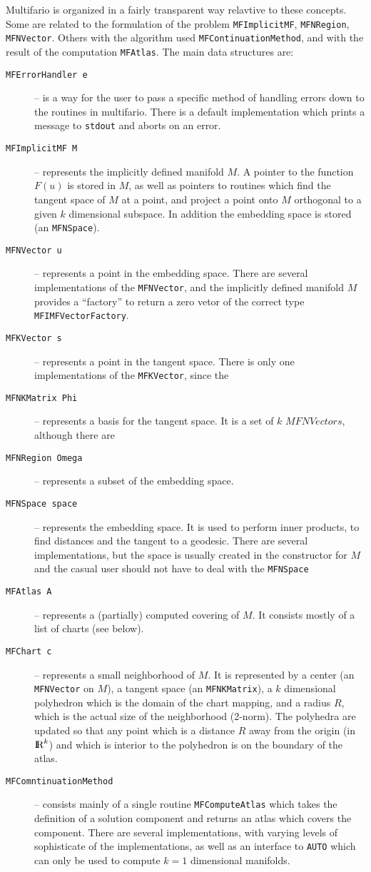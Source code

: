 \documentclass[12pt]{article}
\def\R{\hbox{\rm I\kern-.2150em R}}
\begin{document}
Multifario is organized in a fairly transparent way relavtive to these concepts. Some are related to the formulation of 
the problem {\tt MFImplicitMF}, {\tt MFNRegion}, {\tt MFNVector}. Others with the algorithm used {\tt MFContinuationMethod},
and with the result of the computation {\tt MFAtlas}.
The main data structures are:
\begin{description}
\item [\tt MFErrorHandler e ] -- is a way for the user to pass a specific method of handling errors down to the routines in multifario. There is a default implementation which prints a message to {\tt stdout} and aborts on an error.
\item [\tt MFImplicitMF M ] -- represents the implicitly defined manifold $M$. A pointer to the function $F(u)$ is stored in $M$,
as well as pointers to routines which find the tangent space of $M$ at a point, and project a point onto $M$ orthogonal
to a given $k$ dimensional subspace. In addition the embedding space is stored (an {\tt MFNSpace}). 
\item [\tt MFNVector u ] -- represents a point in the embedding space. There are several implementations of the {\tt MFNVector},
and the implicitly defined manifold $M$ provides a ``factory'' to return a zero vetor of the correct type {\tt MFIMFVectorFactory}.
\item [\tt MFKVector s ] -- represents a point in the tangent space. There is only one implementations of the {\tt MFKVector}, since the
\item [\tt MFNKMatrix Phi ] -- represents a basis for the tangent space. It is a set of $k$ $MFNVectors$, although there are
\item [\tt MFNRegion Omega ] -- represents a subset of the embedding space.
\item [\tt MFNSpace space ] -- represents the embedding space. It is used to perform inner products, to find distances and the tangent 
to a geodesic. There are several implementations, but the space is usually created in the constructor for $M$ and the casual user 
should not have to deal with the {\tt MFNSpace}
\item [\tt MFAtlas A ] -- represents a (partially) computed covering of $M$. It consists mostly of a list of charts (see below).
\item [\tt MFChart c ] -- represents a small neighborhood of $M$. It is represented by a center (an {\tt MFNVector} on $M$), a
tangent space (an {\tt MFNKMatrix}), a $k$ dimensional polyhedron which is the domain of the chart mapping, and a radius $R$, which
is the actual size of the neighborhood (2-norm). The polyhedra are updated so that any point which is a distance $R$ away from
the origin (in $\R^k$) and which is interior to the polyhedron is on the boundary of the atlas.
\item [\tt MFComntinuationMethod ] -- consists mainly of a single routine {\tt MFComputeAtlas} which takes the definition of a 
solution component and returns an atlas which covers the component. There are several implementations, with varying levels of 
sophisticate of the implementations, as well as an interface to {\tt AUTO} which can only be used to compute $k=1$ dimensional
manifolds.
\end{description}
\end{document}
